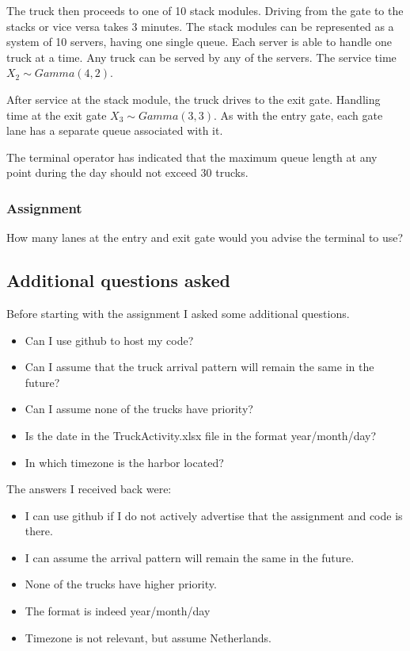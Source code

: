 \documentclass{article}
\begin{document}
The truck then proceeds to one of 10 stack modules. Driving from the
gate to the stacks or vice versa takes 3 minutes. The stack modules
can be represented as a system of 10 servers, having one single
queue. Each server is able to handle one truck at a time. Any truck
can be served by any of the servers. The service time $X_2 \sim
Gamma(4, 2)$.

After service at the stack module, the truck drives to the exit
gate. Handling time at the exit gate $X_3 \sim Gamma(3, 3)$. As with
the entry gate, each gate lane has a separate queue associated with
it.

The terminal operator has indicated that the maximum queue length at
any point during the day should not exceed 30 trucks.

\subsubsection{Assignment}

How many lanes at the entry and exit gate would you advise the
terminal to use?

\subsection{Additional questions asked}

Before starting with the assignment I asked some additional questions.

\begin{itemize}
\item Can I use github to host my code?
\item Can I assume that the truck arrival pattern will remain the same
  in the future?
\item Can I assume none of the trucks have priority?
\item Is the date in the TruckActivity.xlsx file in the format
  year/month/day?
\item In which timezone is the harbor located?
\end{itemize}

The answers I received back were:

\begin{itemize}
\item I can use github if I do not actively advertise that the
  assignment and code is there.
\item I can assume the arrival pattern will remain the same in the
  future.
\item None of the trucks have higher priority.
\item The format is indeed year/month/day
\item Timezone is not relevant, but assume Netherlands.
\end{itemize}
\end{document}
